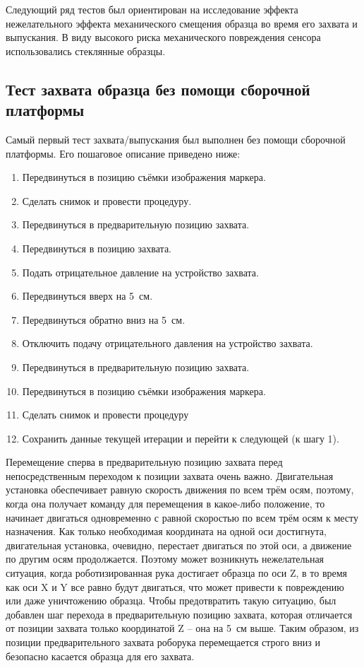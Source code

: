 Следующий ряд тестов был ориентирован на исследование эффекта нежелательного эффекта механического смещения образца во время его захвата и выпускания. В виду высокого риска механического повреждения сенсора использовались стеклянные образцы.

\subsection{Тест захвата образца без помощи сборочной платформы}

Самый первый тест захвата/выпускания был выполнен без помощи сборочной платформы. Его пошаговое описание приведено ниже:

\begin{enumerate}
\setlength\itemsep{-0.5em}
\item Передвинуться в позицию съёмки изображения маркера.
\item Сделать снимок и провести процедуру.
\item Передвинуться в предварительную позицию захвата.
\item Передвинуться в позицию захвата.
\item Подать отрицательное давление на устройство захвата.
\item Передвинуться вверх на 5~см.
\item Передвинуться обратно вниз на 5~см.
\item Отключить подачу отрицательного давления на устройство захвата.
\item Передвинуться в предварительную позицию захвата.
\item Передвинуться в позицию съёмки изображения маркера.
\item Сделать снимок и провести процедуру
\item Сохранить данные текущей итерации и перейти к следующей (к шагу 1).
\end{enumerate}

Перемещение сперва в предварительную позицию захвата перед непосредственным переходом к позиции захвата очень важно. Двигательная установка обеспечивает равную скорость движения по всем трём осям, поэтому, когда она получает команду для перемещения в какое-либо положение, то начинает двигаться одновременно с равной скоростью по всем трём осям к месту назначения. Как только необходимая координата на одной оси достигнута, двигательная установка, очевидно, перестает двигаться по этой оси, а движение по другим осям продолжается. Поэтому может возникнуть нежелательная ситуация, когда роботизированная рука достигает образца по оси Z, в то время как оси X и Y все равно будут двигаться, что может привести к повреждению или даже уничтожению образца. Чтобы предотвратить такую ситуацию, был добавлен шаг перехода в предварительную позицию захвата, которая отличается от позиции захвата только координатой Z -- она на 5~см выше. Таким образом, из позиции предварительного захвата роборука перемещается строго вниз и безопасно касается образца для его захвата.

